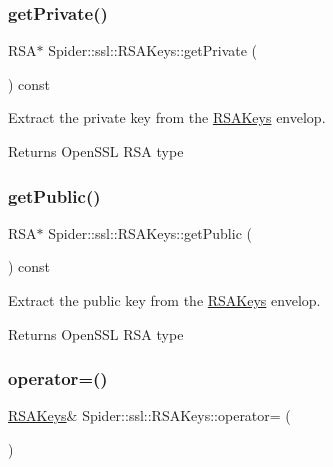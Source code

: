 \subsubsection{\texorpdfstring{get\+Private()}{getPrivate()}}
{\footnotesize\ttfamily R\+SA$\ast$ Spider\+::ssl\+::\+R\+S\+A\+Keys\+::get\+Private (\begin{DoxyParamCaption}{ }\end{DoxyParamCaption}) const\hspace{0.3cm}{\ttfamily [inline]}}



Extract the private key from the \hyperlink{class_spider_1_1ssl_1_1_r_s_a_keys}{R\+S\+A\+Keys} envelop. 

\begin{DoxyReturn}{Returns}
Open\+S\+SL R\+SA type 
\end{DoxyReturn}
\mbox{\label{class_spider_1_1ssl_1_1_r_s_a_keys_afa3b28ea88c61b6ddf602e70843d6471}} 
\subsubsection{\texorpdfstring{get\+Public()}{getPublic()}}
{\footnotesize\ttfamily R\+SA$\ast$ Spider\+::ssl\+::\+R\+S\+A\+Keys\+::get\+Public (\begin{DoxyParamCaption}{ }\end{DoxyParamCaption}) const\hspace{0.3cm}{\ttfamily [inline]}}



Extract the public key from the \hyperlink{class_spider_1_1ssl_1_1_r_s_a_keys}{R\+S\+A\+Keys} envelop. 

\begin{DoxyReturn}{Returns}
Open\+S\+SL R\+SA type 
\end{DoxyReturn}
\mbox{\label{class_spider_1_1ssl_1_1_r_s_a_keys_aa51f09af42c08d805e34bf351f478adc}} 
\subsubsection{\texorpdfstring{operator=()}{operator=()}}
{\footnotesize\ttfamily \hyperlink{class_spider_1_1ssl_1_1_r_s_a_keys}{R\+S\+A\+Keys}\& Spider\+::ssl\+::\+R\+S\+A\+Keys\+::operator= (\begin{DoxyParamCaption}\item[{const \hyperlink{class_spider_1_1ssl_1_1_r_s_a_keys}{R\+S\+A\+Keys} \&}]{ }\end{DoxyParamCaption})\hspace{0.3cm}{\ttfamily [delete]}}



